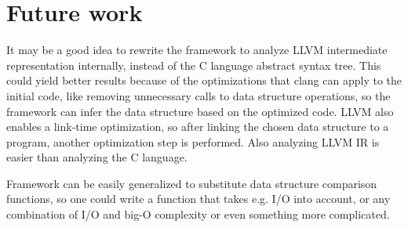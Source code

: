 \documentclass[a4paper,11pt]{article}
\begin{document}
\section{Future work} \label{sec:future}
	It may be a good idea to rewrite the framework to analyze LLVM\cite{LLVM} intermediate representation internally,
    instead of the C language abstract syntax tree. This could yield better results because of the optimizations that clang
    \cite{Clang} can apply to
	the initial code, like removing unnecessary calls to data structure operations, so the framework can infer the
	data structure based on the optimized code. LLVM also enables a link-time optimization, so after linking the
	chosen data structure to a program, another optimization step is performed. Also analyzing LLVM IR is easier
	than analyzing the C language.

    Framework can be easily generalized to substitute data structure comparison functions, so one could write a function
    that takes e.g. I/O into account, or any combination of I/O and big-O complexity or even something more complicated.
\end{document}
